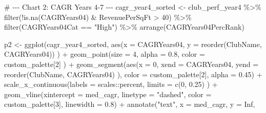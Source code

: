 \documentclass[
  letterpaper,
  oneside,
  11pt]{article}
\newenvironment{Shaded}{\begin{snugshade}}{\end{snugshade}}
\newcommand{\AttributeTok}[1]{\textcolor[rgb]{0.40,0.45,0.13}{#1}}
\newcommand{\CommentTok}[1]{\textcolor[rgb]{0.37,0.37,0.37}{#1}}
\newcommand{\ConstantTok}[1]{\textcolor[rgb]{0.56,0.35,0.01}{#1}}
\newcommand{\DecValTok}[1]{\textcolor[rgb]{0.68,0.00,0.00}{#1}}
\newcommand{\FloatTok}[1]{\textcolor[rgb]{0.68,0.00,0.00}{#1}}
\newcommand{\FunctionTok}[1]{\textcolor[rgb]{0.28,0.35,0.67}{#1}}
\newcommand{\NormalTok}[1]{\textcolor[rgb]{0.00,0.23,0.31}{#1}}
\newcommand{\OtherTok}[1]{\textcolor[rgb]{0.00,0.23,0.31}{#1}}
\newcommand{\SpecialCharTok}[1]{\textcolor[rgb]{0.37,0.37,0.37}{#1}}
\newcommand{\StringTok}[1]{\textcolor[rgb]{0.13,0.47,0.30}{#1}}
\begin{document}
\begin{Shaded}
\begin{Highlighting}[]
\CommentTok{\# {-}{-}{-} Chart 2: CAGR Years 4{-}7 {-}{-}{-}}
\NormalTok{cagr\_year4\_sorted }\OtherTok{\textless{}{-}}\NormalTok{ club\_perf\_year4 }\SpecialCharTok{\%\textgreater{}\%}
  \FunctionTok{filter}\NormalTok{(}\SpecialCharTok{!}\FunctionTok{is.na}\NormalTok{(CAGRYears04) }\SpecialCharTok{\&}\NormalTok{ RevenuePerSqFt }\SpecialCharTok{\textgreater{}} \DecValTok{40}\NormalTok{) }\SpecialCharTok{\%\textgreater{}\%}
  \FunctionTok{filter}\NormalTok{(CAGRYears04Cat }\SpecialCharTok{==} \StringTok{"High"}\NormalTok{) }\SpecialCharTok{\%\textgreater{}\%}
  \FunctionTok{arrange}\NormalTok{(CAGRYears04PercRank)}

\NormalTok{p2 }\OtherTok{\textless{}{-}} \FunctionTok{ggplot}\NormalTok{(cagr\_year4\_sorted, }
             \FunctionTok{aes}\NormalTok{(}\AttributeTok{x =}\NormalTok{ CAGRYears04, }
                 \AttributeTok{y =} \FunctionTok{reorder}\NormalTok{(ClubName, CAGRYears04))}
\NormalTok{             ) }\SpecialCharTok{+}
  \FunctionTok{geom\_point}\NormalTok{(}\AttributeTok{size =} \DecValTok{4}\NormalTok{, }
             \AttributeTok{alpha =} \FloatTok{0.8}\NormalTok{, }
             \AttributeTok{color =}\NormalTok{ custom\_palette[}\DecValTok{2}\NormalTok{]}
\NormalTok{             ) }\SpecialCharTok{+}
  \FunctionTok{geom\_segment}\NormalTok{(}\FunctionTok{aes}\NormalTok{(}\AttributeTok{x =} \DecValTok{0}\NormalTok{, }
                   \AttributeTok{xend =}\NormalTok{ CAGRYears04, }
                   \AttributeTok{yend =} \FunctionTok{reorder}\NormalTok{(ClubName, CAGRYears04)}
\NormalTok{                   ),}
               \AttributeTok{color =}\NormalTok{ custom\_palette[}\DecValTok{2}\NormalTok{], }
               \AttributeTok{alpha =} \FloatTok{0.45}\NormalTok{) }\SpecialCharTok{+}
  \FunctionTok{scale\_x\_continuous}\NormalTok{(}\AttributeTok{labels =}\NormalTok{ scales}\SpecialCharTok{::}\NormalTok{percent, }
                     \AttributeTok{limits =} \FunctionTok{c}\NormalTok{(}\DecValTok{0}\NormalTok{, }\FloatTok{0.25}\NormalTok{)}
\NormalTok{                     ) }\SpecialCharTok{+}
  \FunctionTok{geom\_vline}\NormalTok{(}\AttributeTok{xintercept =}\NormalTok{ med\_cagr, }
             \AttributeTok{linetype =} \StringTok{"dashed"}\NormalTok{, }
             \AttributeTok{color =}\NormalTok{ custom\_palette[}\DecValTok{3}\NormalTok{], }
             \AttributeTok{linewidth =} \FloatTok{0.8}\NormalTok{) }\SpecialCharTok{+}
  \FunctionTok{annotate}\NormalTok{(}\StringTok{"text"}\NormalTok{, }\AttributeTok{x =}\NormalTok{ med\_cagr, }\AttributeTok{y =} \ConstantTok{Inf}\NormalTok{, }

\end{Highlighting}
\end{Shaded}
\end{document}
